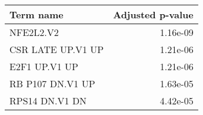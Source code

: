 \begin{tabular}{lr}
\toprule
         Term name &  Adjusted p-value \\
\midrule
         NFE2L2.V2 &          1.16e-09 \\
 CSR LATE UP.V1 UP &          1.21e-06 \\
     E2F1 UP.V1 UP &          1.21e-06 \\
  RB P107 DN.V1 UP &          1.63e-05 \\
    RPS14 DN.V1 DN &          4.42e-05 \\
\bottomrule
\end{tabular}
